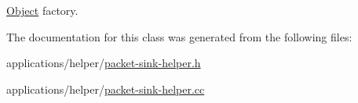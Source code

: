 \hyperlink{classns3_1_1Object}{Object} factory. 



The documentation for this class was generated from the following files\+:\begin{DoxyCompactItemize}
\item 
applications/helper/\hyperlink{packet-sink-helper_8h}{packet-\/sink-\/helper.\+h}\item 
applications/helper/\hyperlink{packet-sink-helper_8cc}{packet-\/sink-\/helper.\+cc}\end{DoxyCompactItemize}
